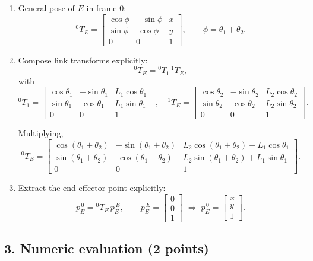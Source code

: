 \documentclass[11pt]{article}
\begin{document}
\begin{enumerate}[label=(\alph*)]
\item General pose of $E$ in frame $0$:
\[
{}^{0}\!T_{E}=
\begin{bmatrix}
\cos\phi & -\sin\phi & x\\[2pt]
\sin\phi & \ \cos\phi & y\\[2pt]
0&0&1
\end{bmatrix},\qquad \phi=\theta_1+\theta_2 .
\]

\item Compose link transforms explicitly:
\[
{}^{0}\!T_{E} = {}^{0}\!T_{1}\,{}^{1}\!T_{E},
\]
with
\[
{}^{0}\!T_{1}=
\begin{bmatrix}
\cos\theta_1 & -\sin\theta_1 & L_1\cos\theta_1\\
\sin\theta_1 & \ \cos\theta_1 & L_1\sin\theta_1\\
0&0&1
\end{bmatrix},\quad
{}^{1}\!T_{E}=
\begin{bmatrix}
\cos\theta_2 & -\sin\theta_2 & L_2\cos\theta_2\\
\sin\theta_2 & \ \cos\theta_2 & L_2\sin\theta_2\\
0&0&1
\end{bmatrix}.
\]

Multiplying,
\[
{}^{0}\!T_{E}=
\begin{bmatrix}
\cos(\theta_1+\theta_2) & -\sin(\theta_1+\theta_2) & L_2\cos(\theta_1+\theta_2)+L_1\cos\theta_1\\[2pt]
\sin(\theta_1+\theta_2) & \ \cos(\theta_1+\theta_2) & L_2\sin(\theta_1+\theta_2)+L_1\sin\theta_1\\[2pt]
0&0&1
\end{bmatrix}.
\]

\item Extract the end-effector point explicitly:
\[
p_E^{\,0} = {}^{0}\!T_{E}\,p_E^{\,E},
\qquad
p_E^{\,E}=\begin{bmatrix}0\\0\\1\end{bmatrix}
\;\Rightarrow\;
p_E^{\,0}=\begin{bmatrix}x\\y\\1\end{bmatrix}.
\]
\end{enumerate}

\subsection*{3. Numeric evaluation (2 points)}
\end{document}
